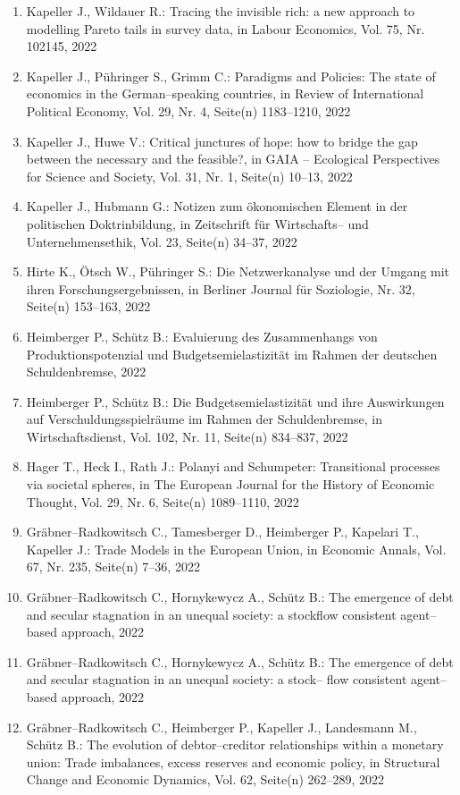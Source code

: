 \begin{enumerate}
	 \item Kapeller J., Wildauer R.: Tracing the invisible rich: a new approach to modelling Pareto tails in survey data, in Labour Economics, Vol. 75, Nr. 102145, 2022
	 \item Kapeller J., Pühringer S., Grimm C.: Paradigms and Policies: The state of economics in the German--speaking countries, in Review of International Political Economy, Vol. 29, Nr. 4, Seite(n) 1183--1210, 2022
	 \item Kapeller J., Huwe V.: Critical junctures of hope: how to bridge the gap between the necessary and the feasible?, in GAIA -- Ecological Perspectives for Science and Society, Vol. 31, Nr. 1, Seite(n) 10--13, 2022
	 \item Kapeller J., Hubmann G.: Notizen zum ökonomischen Element in der politischen Doktrinbildung, in Zeitschrift für Wirtschafts-- und Unternehmensethik, Vol. 23, Seite(n) 34--37, 2022
	 \item Hirte K., Ötsch W., Pühringer S.: Die Netzwerkanalyse und der Umgang mit ihren Forschungsergebnissen, in Berliner Journal für Soziologie, Nr. 32, Seite(n) 153--163, 2022
	 \item Heimberger P., Schütz B.: Evaluierung des Zusammenhangs von Produktionspotenzial und Budgetsemielastizität im Rahmen der deutschen Schuldenbremse, 2022
	 \item Heimberger P., Schütz B.: Die Budgetsemielastizität und ihre Auswirkungen auf Verschuldungsspielräume im Rahmen der Schuldenbremse, in Wirtschaftsdienst, Vol. 102, Nr. 11, Seite(n) 834--837, 2022
	 \item Hager T., Heck I., Rath J.: Polanyi and Schumpeter: Transitional processes via societal spheres, in The European Journal for the History of Economic Thought, Vol. 29, Nr. 6, Seite(n) 1089–1110, 2022
	 \item Gräbner--Radkowitsch C., Tamesberger D., Heimberger P., Kapelari T., Kapeller J.: Trade Models in the European Union, in Economic Annals, Vol. 67, Nr. 235, Seite(n) 7--36, 2022
	 \item Gräbner--Radkowitsch C., Hornykewycz A., Schütz B.: The emergence of debt and secular stagnation in an unequal society: a stockflow consistent agent--based approach, 2022
	 \item Gräbner--Radkowitsch C., Hornykewycz A., Schütz B.: The emergence of debt and secular stagnation in an unequal society: a stock-- flow consistent agent--based approach, 2022
	 \item Gräbner--Radkowitsch C., Heimberger P., Kapeller J., Landesmann M., Schütz B.: The evolution of debtor--creditor relationships within a monetary union: Trade imbalances, excess reserves and economic policy, in Structural Change and Economic Dynamics, Vol. 62, Seite(n) 262--289, 2022

\end{enumerate}

